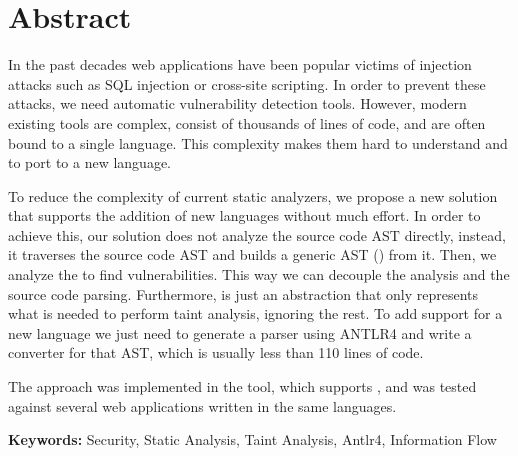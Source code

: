 
\section*{Abstract}


In the past decades web applications have been popular victims of injection attacks such as SQL injection or cross-site scripting. In order to prevent these attacks, we need automatic vulnerability detection tools. However, modern existing tools are complex, consist of thousands of lines of code, and are often bound to a single language. This complexity makes them hard to understand and to port to a new language. 


To reduce the complexity of current static analyzers, we propose a new solution that supports the addition of new languages without much effort. In order to achieve this, our solution does not analyze the source code AST directly, instead, it traverses the source code AST and builds a generic AST (\astname{}) from it. Then, we analyze the \astname{} to find vulnerabilities. This way we can decouple the analysis and the source code parsing. Furthermore, \astname{} is just an abstraction that only represents what is needed to perform taint analysis, ignoring the rest. To add support for a new language we just need to generate a parser using ANTLR4 \cite{antlr4book} and write a converter for that AST, which is usually less than 110 lines of code. 

The approach was implemented in the \toolname{} tool, which supports \implangs{}, and was tested against several web applications written in the same languages.
\vfill

\textbf{\Large Keywords:} Security, Static Analysis, Taint Analysis, Antlr4, Information Flow
